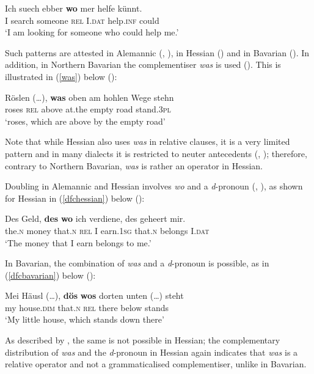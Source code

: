 \ea \gll Ich suech ebber \textbf{wo} mer helfe künnt. \label{relwoalemannicrepeat}\\
I search someone \textsc{rel} I.\textsc{dat} help.\textsc{inf} could\\
\glt `I am looking for someone who could help me.'
\z

Such patterns are attested in Alemannic (\citealt{brandnerbraeuning2013}, \citealt{weiss2013}), in Hessian (\citealt{fleischer2004, fleischer2016}) and in Bavarian (\citealt{weiss2013}). In addition, in Northern Bavarian the complementiser \textit{was} is used (\citealt{weiss2013}). This is illustrated in (\ref{was}) below (\citealt[780, ex. 19c]{weiss2013}):

\ea \gll Röslen (\ldots), \textbf{was} oben am hohlen Wege stehn \label{was}\\
roses \phantom{\ldots} \textsc{rel} above at.the empty road stand.\textsc{3pl}\\
\glt `roses, which are above by the empty road'
\z 

Note that while Hessian also uses \textit{was} in relative clauses, it is a very limited pattern and in many dialects it is restricted to neuter antecedents (\citealt{fleischer2004, fleischer2016}, \citealt{weiss2013}); therefore, contrary to Northern Bavarian, \textit{was} is rather an operator in Hessian.

Doubling in Alemannic and Hessian involves \textit{wo} and a \textit{d}-pronoun (\citealt{brandnerbraeuning2013}, \citealt{fleischer2016}), as shown for Hessian in (\ref{dfchessian}) below (\citealt{fleischer2016}):

\ea \gll Des Geld, \textbf{des} \textbf{wo} ich verdiene, des geheert mir. \label{dfchessian}\\
the.\textsc{n} money that.\textsc{n} \textsc{rel} I earn.\textsc{1sg} that.\textsc{n} belongs I.\textsc{dat}\\
\glt `The money that I earn belongs to me.'
\z

In Bavarian, the combination of \textit{was} and a \textit{d}-pronoun is possible, as in (\ref{dfcbavarian}) below (\citealt[780, ex. 19d]{weiss2013}):

\ea \gll Mei Häusl (\ldots), \textbf{dös} \textbf{wos} dorten unten (\ldots) steht \label{dfcbavarian}\\
my house.\textsc{dim} {} that.\textsc{n} \textsc{rel} there below {} stands\\
\glt `My little house, which stands down there'
\z

As described by \citet{fleischer2016}, the same is not possible in Hessian; the complementary distribution of \textit{was} and the \textit{d}-pronoun in Hessian again indicates that \textit{was} is a relative operator and not a grammaticalised complementiser, unlike in Bavarian.


